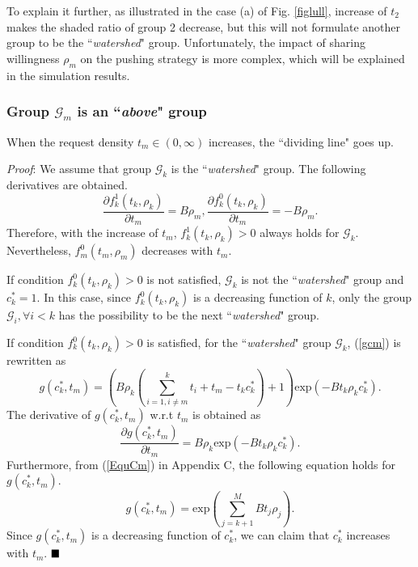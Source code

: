 \documentclass[12pt, draftclsnofoot, onecolumn]{IEEEtran}
\begin{document}
To explain it further, as illustrated in the case (a) of Fig. \ref{figlull}, increase of $t_2$ makes the shaded ratio of group 2 decrease, but this will not formulate another group to be the ``\textit{watershed}" group. Unfortunately, the impact of sharing willingness $\rho_m$ on the pushing strategy is more complex, which will be explained in the simulation results.

\subsubsection{Group $\mathcal{G}_{m}$ is an ``\textit{above}" group}
\begin{proposition}\label{Prop2}
When the request density $t_m \in (0, \infty)$ increases, the ``dividing line" goes up.
\end{proposition}
\textit{Proof}: We assume that group $\mathcal{G}_{k}$ is the ``\textit{watershed}" group.
The following derivatives are obtained.
\begin{equation}
\frac{\partial f^1_k(t_k, \rho_k) }{\partial t_m} = B\rho_m, \frac{\partial f^0_k(t_k, \rho_k) }{\partial t_m} = -B\rho_m.
\end{equation}
Therefore, with the increase of $t_m$, $f^1_k(t_k, \rho_k)>0$ always holds for $\mathcal{G}_{k}$. Nevertheless, $f^0_m(t_m, \rho_m)$ decreases with $t_m$.

If condition $f^0_k(t_k, \rho_k) >0 $ is not satisfied, $\mathcal{G}_{k}$ is not the ``\textit{watershed}" group and $c_k^{\ast}=1$.
In this case, since $f^0_k(t_k, \rho_k)$ is a decreasing function of $k$, only the group $\mathcal{G}_{i}, \forall i <k$ has the possibility to be the next ``\textit{watershed}" group.

If condition $f^0_k(t_k, \rho_k)>0$ is satisfied, for the ``\textit{watershed}" group $\mathcal{G}_{k}$, (\ref{gcm}) is rewritten as
\begin{equation}
g(c_k^{\ast},t_m)=\left(B \rho_k\left({\sum\limits_{i =1,i\neq m}^{k}t_i}+ t_m-t_k c_k^{\ast}\right) + 1\right) \textrm{exp}(-B t_k\rho_k c_k^{\ast}).
\end{equation}
The derivative of $g(c_k^{\ast},t_m)$ w.r.t $t_m$ is obtained as
\begin{equation}
\frac{\partial g(c_k^{\ast},t_m) }{\partial t_m}=B \rho_k\textrm{exp}(-B t_k\rho_k c_k^{\ast}).
\end{equation}
Furthermore, from (\ref{EquCm}) in Appendix C, the following equation holds for $g(c_k^{\ast},t_m)$.
\begin{equation}\label{Eqg}
g(c_k^{\ast},t_m)= \textrm{exp}\left(\sum\limits_{j=k+1}^{M} B t_j \rho_j \right).
\end{equation}
Since $g(c_k^{\ast},t_m)$ is a decreasing function of $c_k^{\ast}$, we can claim that $c_k^{\ast}$ increases with $t_m$.
$\hfill\blacksquare$
\end{document}

